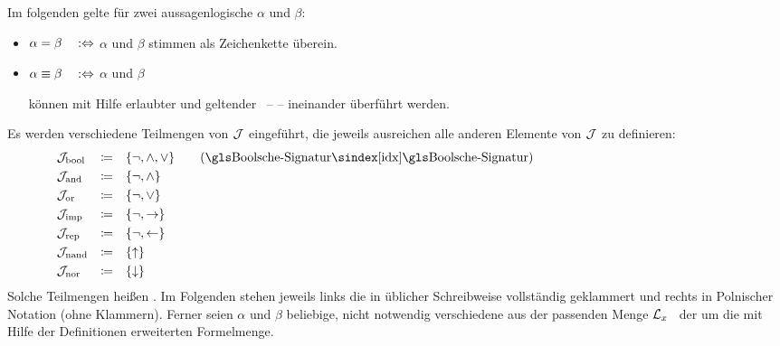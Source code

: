 Im folgenden gelte für zwei aussagenlogische  $\alpha$ und $\beta$:
\begin{itemize}
	\item[] $\alpha =    \beta \quad :\Leftrightarrow$ \quad $\alpha$ und $\beta$
	stimmen als Zeichenkette überein.
	\item[] $\alpha \equiv \beta \quad :\Leftrightarrow$ \quad $\alpha$ und $\beta$
	\parbox[t]{11cm}{können mit Hilfe erlaubter  und geltender \Axiome\ --  -- ineinander überführt werden.}
\end{itemize}
%
Es werden verschiedene Teilmengen von $\mathcal{J}$ eingeführt, die jeweils ausreichen alle anderen Elemente von $\mathcal{J}$ zu definieren:
\begin{align}
	& \alJun_\iBool & \defeq & \quad\{ \lnot, \land, \lor \} \label{def:Jbool}
	\qquad (\text{\glsIdx{Boolsche-Signatur}})
	\\
	& \alJun_\iAnd  & \defeq & \quad\{ \lnot, \land       \} \label{def:Jand}
	\\
	& \alJun_\iOr   & \defeq & \quad\{ \lnot, \lor        \} \label{def:Jor}
	\\
	& \alJun_\iImp  & \defeq & \quad\{ \lnot, \limp       \} \label{def:Jimp}
	\\
	& \alJun_\iRep  & \defeq & \quad\{ \lnot, \lrep       \} \label{def:Jrep}
	\\
	& \alJun_\iNand & \defeq & \quad\{ \lnand             \} \label{def:Jnand}
	\\
	& \alJun_\iNor  & \defeq & \quad\{ \lnor              \} \label{def:Jnor}
	\formulatoleft\formulatoleft\formulatoleft
\end{align}
Solche Teilmengen heißen .
%
Im Folgenden stehen jeweils links die  in üblicher Schreibweise vollständig geklammert und rechts in Polnischer Notation (ohne Klammern).
Ferner seien $\alpha$ und $\beta$ beliebige, nicht notwendig verschiedene  aus der passenden Menge $\mathcal{L}_x$ \textbzgl\ der um die mit Hilfe der Definitionen erweiterten Formelmenge.

